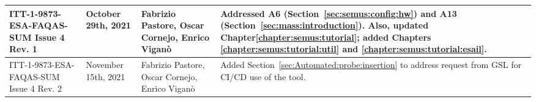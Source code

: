 \begin{longtable}{|p{2cm}|p{2cm}|p{2cm}|p{8cm}|@{}}
\hline

ITT-1-9873-ESA-FAQAS-SUM
Issue 4 Rev. 1&
October 29th, 2021&
Fabrizio Pastore, Oscar Cornejo, Enrico Viganò&
\begin{minipage}{8cm}
Addressed A6 (Section~\ref{sec:semus:config:hw}) and A13 (Section~\ref{sec:mass:introduction}). Also, updated Chapter\ref{chapter:semus:tutorial}; added Chapters \ref{chapter:semus:tutorial:util} and \ref{chapter:semus:tutorial:esail}.
\end{minipage}
\\

\hline

ITT-1-9873-ESA-FAQAS-SUM
Issue 4 Rev. 2&
November 15th, 2021&
Fabrizio Pastore, Oscar Cornejo, Enrico Viganò&
\begin{minipage}{8cm}
Added Section~\ref{sec:Automated:probe:insertion} to address request from GSL for CI/CD use of the tool.
\end{minipage}
\\



\hline



                                                    
\end{longtable}
\normalsize

\clearpage